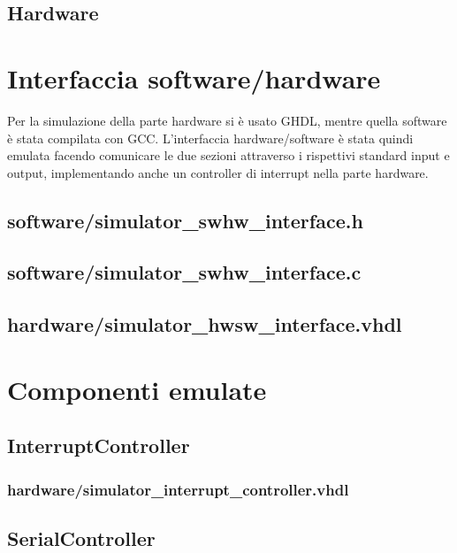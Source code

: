\documentclass [11pt,a4paper,oneside]{paper}
\newcommand{\inputVHDL}[1]{}
\newcommand{\inputC}[1]{}
\begin{document}
\subsection{Hardware}
\inputVHDL{hardware/hardware.vhdl}


\section{Interfaccia software/hardware}
Per la simulazione della parte hardware si è usato GHDL, mentre quella software
è stata compilata con GCC. L'interfaccia hardware/software è stata quindi emulata
facendo comunicare le due sezioni attraverso i rispettivi standard input e output,
implementando anche un controller di interrupt nella parte hardware.

\subsection{software/simulator\_swhw\_interface.h}
\inputC{software/simulator_swhw_interface.h}

\subsection{software/simulator\_swhw\_interface.c}
\inputC{software/simulator_swhw_interface.c}

\subsection{hardware/simulator\_hwsw\_interface.vhdl}
\inputVHDL{hardware/simulator_hwsw_interface.vhdl}


\section{Componenti emulate}
\subsection{InterruptController}
\subsubsection{hardware/simulator\_interrupt\_controller.vhdl}
\inputVHDL{hardware/simulator_interrupt_controller.vhdl}

\subsection{SerialController}
\end{document}
